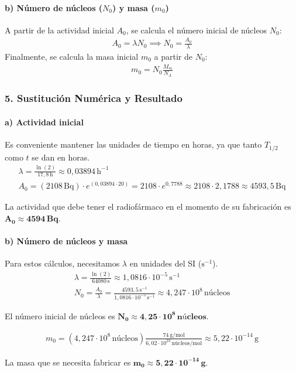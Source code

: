 \paragraph{b) Número de núcleos ($N_0$) y masa ($m_0$)}
A partir de la actividad inicial $A_0$, se calcula el número inicial de núcleos $N_0$:
\begin{gather}
    A_0 = \lambda N_0 \implies N_0 = \frac{A_0}{\lambda}
\end{gather}
Finalmente, se calcula la masa inicial $m_0$ a partir de $N_0$:
\begin{gather}
    m_0 = N_0 \frac{M_m}{N_A}
\end{gather}

\subsubsection*{5. Sustitución Numérica y Resultado}
\paragraph{a) Actividad inicial}
Es conveniente mantener las unidades de tiempo en horas, ya que tanto $T_{1/2}$ como $t$ se dan en horas.
\begin{gather}
    \lambda = \frac{\ln(2)}{17,8 \, \text{h}} \approx 0,03894 \, \text{h}^{-1} \\
    A_0 = (2108 \, \text{Bq}) \cdot e^{(0,03894 \cdot 20)} = 2108 \cdot e^{0,7788} \approx 2108 \cdot 2,1788 \approx 4593,5 \, \text{Bq}
\end{gather}
\begin{cajaresultado}
La actividad que debe tener el radiofármaco en el momento de su fabricación es $\boldsymbol{A_0 \approx 4594 \, \textbf{Bq}}$.
\end{cajaresultado}
\paragraph{b) Número de núcleos y masa}
Para estos cálculos, necesitamos $\lambda$ en unidades del SI ($\text{s}^{-1}$).
\begin{gather}
    \lambda = \frac{\ln(2)}{64080 \, \text{s}} \approx 1,0816 \cdot 10^{-5} \, \text{s}^{-1} \\
    N_0 = \frac{A_0}{\lambda} = \frac{4593,5 \, \text{s}^{-1}}{1,0816 \cdot 10^{-5} \, \text{s}^{-1}} \approx 4,247 \cdot 10^8 \, \text{núcleos}
\end{gather}
\begin{cajaresultado}
El número inicial de núcleos es $\boldsymbol{N_0 \approx 4,25 \cdot 10^8 \, \textbf{núcleos}}$.
\end{cajaresultado}
\begin{gather}
    m_0 = (4,247 \cdot 10^8 \, \text{núcleos}) \frac{74 \, \text{g/mol}}{6,02\cdot10^{23} \, \text{núcleos/mol}} \approx 5,22 \cdot 10^{-14} \, \text{g}
\end{gather}
\begin{cajaresultado}
La masa que se necesita fabricar es $\boldsymbol{m_0 \approx 5,22 \cdot 10^{-14} \, \textbf{g}}$.
\end{cajaresultado}


